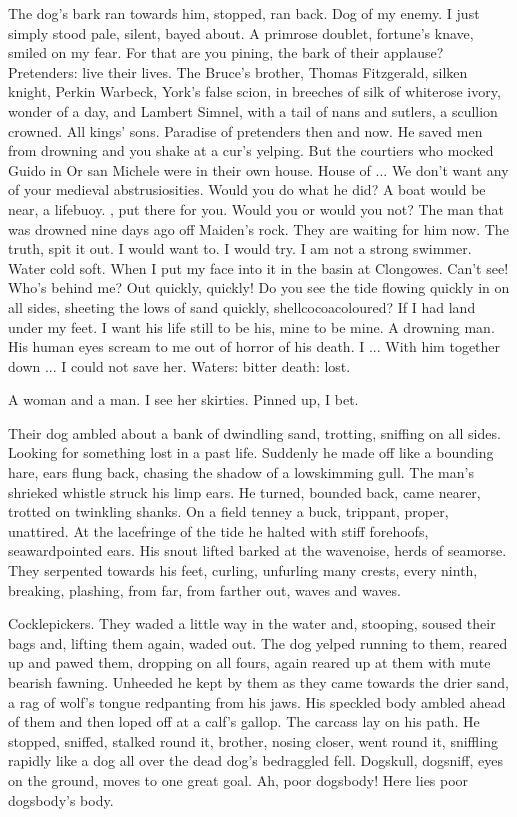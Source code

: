 The dog's bark ran towards him, stopped, ran back.
Dog of my enemy.
I just simply stood pale, silent, bayed about.
A primrose doublet, fortune's knave, smiled on my fear.
For that are you pining,
the bark of their applause?
Pretenders:
live their lives.
The Bruce's brother,
Thomas Fitzgerald, silken knight,
Perkin Warbeck, York's false scion,
in breeches of silk of whiterose ivory,
wonder of a day,
and Lambert Simnel, with a tail of nans and sutlers, a scullion crowned.
All kings' sons.
Paradise of pretenders then and now.
He saved men from drowning
and you shake at a cur's yelping.
But the courtiers who mocked Guido in Or san Michele were in their own house.
House of ...
We don't want any of your medieval abstrusiosities.
Would you do what he did?
A boat would be near, a lifebuoy.
, put there for you.
Would you or would you not?
The man that was drowned nine days ago off Maiden's rock.
They are waiting for him now.
The truth, spit it out.
I would want to.
I would try.
I am not a strong swimmer.
Water cold soft.
When I put my face into it in the basin at Clongowes.
Can't see!
Who's behind me?
Out quickly, quickly!
Do you see the tide flowing quickly in on all sides,
sheeting the lows of sand quickly, shellcocoacoloured?
If I had land under my feet.
I want his life still to be his, mine to be mine.
A drowning man.
His human eyes scream to me out of horror of his death.
I ...
With him together down ...
I could not save her.
Waters:
bitter death:
lost.

A woman and a man.
I see her skirties.
Pinned up, I bet.

Their dog ambled about a bank of dwindling sand,
trotting, sniffing on all sides.
Looking for something lost in a past life.
Suddenly he made off like a bounding hare,
ears flung back, chasing the shadow of a lowskimming gull.
The man's shrieked whistle struck his limp ears.
He turned, bounded back, came nearer, trotted on twinkling shanks.
On a field tenney
a buck, trippant, proper, unattired.
At the lacefringe of the tide
he halted with stiff forehoofs, seawardpointed ears.
His snout lifted
barked at the wavenoise, herds of seamorse.
They serpented towards his feet,
curling, unfurling many crests,
every ninth, breaking, plashing,
from far, from farther out,
waves and waves.

Cocklepickers.
They waded a little way in the water and, stooping,
soused their bags and, lifting them again, waded out.
The dog yelped
running to them,
reared up and pawed them,
dropping on all fours,
again reared up at them with mute bearish fawning.
Unheeded
he kept by them
as they came towards the drier sand,
a rag of wolf's tongue redpanting from his jaws.
His speckled body ambled ahead of them
and then loped off at a calf's gallop.
The carcass lay on his path.
He stopped, sniffed, stalked round it,
brother, nosing closer, went round it,
sniffling rapidly like a dog all over the dead dog's bedraggled fell.
Dogskull, dogsniff,
eyes on the ground,
moves to one great goal.
Ah, poor dogsbody!
Here lies poor dogsbody's body.

